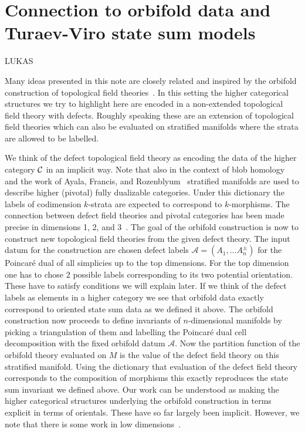 
\section{Connection to orbifold data and Turaev-Viro state sum models}

LUKAS

Many ideas presented in this note are closely related and inspired by the orbifold construction of topological field theories~\cite{carqueville2019orbifolds}. In this setting the higher categorical structures we try to highlight here are encoded in a non-extended topological field theory with defects. Roughly speaking these are an extension of topological field theories which can also be evaluated on stratified manifolds where the strata are allowed to be labelled.

We think of the defect topological field theory as encoding the data of the higher category $\mathcal{C}$ in an implicit way. Note that also in the context of blob homology~\cite{blob} and the work of Ayala, Francis, and Rozenblyum~\cite{Ayala2015ASH} stratified manifolds are used to describe higher (pivotal) fully dualizable categories.
Under this dictionary the labels of codimension $k$-strata are expected to correspond to $k$-morphisms.
The connection between defect field theories and pivotal categories has been made precise in dimensions 1, 2, and 3~\cite{Davydov:2011kb, CARQUEVILLE2020107024}.
The goal of the orbifold construction is now to construct new topological field theories from the given defect theory.
The input datum for the construction are chosen defect labels $\mathcal{A}=(A_1,\dots A_n^{\pm})$ for the Poincaré dual of all simplicies up to the top dimensions.
For the top dimension one has to chose 2 possible labels corresponding to its two potential orientation.
These have to satisfy conditions we will explain later.
If we think of the defect labels as elements in a higher category we see that orbifold data exactly correspond to oriented state sum data as we defined it above.
The orbifold construction now proceeds to define invariants of $n$-dimensional manifolds by picking a triangulation of them and labelling the Poincaré dual cell decomposition with the fixed orbifold datum $\mathcal{A}$.
Now the partition function of the orbifold theory evaluated on $M$ is the value of the defect field theory on this stratified manifold.
Using the dictionary that evaluation of the defect field theory corresponds to the composition of morphisms this exactly reproduces the state sum invariant we defined above.
Our work can be understood as making the higher categorical structures underlying the orbifold construction in terms explicit in terms of orientals.
These have so far largely been implicit.
However, we note that there is some work in low dimensions~\cite{carqueville2016orbifoldcompletion,3DOrb}.

